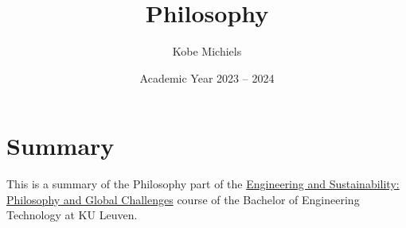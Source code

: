 \documentclass[kul]{kulakarticle} %
\title{Philosophy}
\author{Kobe Michiels}
\date{Academic Year 2023 -- 2024}
\begin{document}
	
	\maketitle
	
	\section*{Summary}
	
	This is a summary of the Philosophy part of the \href{https://onderwijsaanbod.kuleuven.be/syllabi/v/e/T3AID1E.htm#activetab=inhoud_idp1690064}{Engineering and Sustainability: Philosophy and Global Challenges} course of the Bachelor of Engineering Technology at KU Leuven.

	\setcounter{tocdepth}{2}
	\tableofcontents
	
	\newpage
	
	\newpage
	
	\newpage
	
	\newpage
	
	\newpage
	
	
\end{document}

